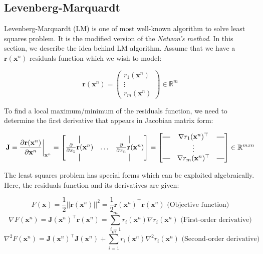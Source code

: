 \documentclass[a4paper]{report}
\numberwithin{figure}{section}
\newcommand{\R}{\mathbb{R}}
\newcommand*{\vertbar}{\rule[-1ex]{0.5pt}{2.5ex}}
\newcommand*{\horzbar}{\rule[.5ex]{2.5ex}{0.5pt}}
\begin{document}
\begin{appendices}
\subsection{Levenberg-Marquardt}
Levenberg-Marquardt (LM) is one of most well-known algorithm 
to solve least squares problem. It is the modified version of the \textit{Netwon's method}. 
In this section, we describe the idea behind 
LM algorithm. Assume that we have a $\mathbf{r}(\mathbf{x}^n)$ residuals 
function which we 
wish to model:

\begin{equation}
  \mathbf{r}(\mathbf{x}^n) = \begin{pmatrix} r_1(\mathbf{x}^n) \\ \vdots \\ r_m(\mathbf{x}^n) \end{pmatrix} \in \R^m
\end{equation}

To find a local maximum/minimum of the residuals function, we need to 
determine the first derivative that 
appears in Jacobian matrix form:

\begin{equation}
  \mathbf{J} = \frac{\partial \mathbf{r}(\mathbf{x}^n)}{\partial \mathbf{x}^n } \bigg|_{\mathbf{x}^n}
  = 
  \begin{bmatrix} 
    \vertbar & & \vertbar \\
    \frac{\partial}{\partial x_1}\mathbf{r}(\mathbf{x}^n) & \dots & \frac{\partial}{\partial x_n}\mathbf{r}(\mathbf{x}^n) \\
    \vertbar & & \vertbar
  \end{bmatrix}
  = 
  \begin{bmatrix}
    \horzbar & \nabla r_1(\mathbf{x}^n)^\top & \horzbar \\
     & \vdots & \\
     \horzbar & \nabla r_m(\mathbf{x}^n)^\top & \horzbar 
  \end{bmatrix}
  \in \R^{mxn}
\end{equation}

The least squares problem has special forms which can be exploited 
algebraically.
Here, the residuals function and its derivatives are given:

\begin{equation}
  F(\mathbf{x}) = \frac{1}{2} ||\mathbf{r}(\mathbf{x}^n)||^2 = \frac{1}{2} 
  \mathbf{r}(\mathbf{x}^n)^\top \mathbf{r}(\mathbf{x}^n) \text{  
  (Objective 
  function)}
\end{equation}\label{eq:residuals_objective}
\begin{equation}
\nabla F(\mathbf{x}^n) = \mathbf{J}(\mathbf{x}^n)^\top 
\mathbf{r}(\mathbf{x}^n) = 
\sum_{i=1}^{m} r_i(\mathbf{x}^n) \nabla r_i(\mathbf{x}^n) \text{  (First-order 
derivative)}
\end{equation}\label{eq:residuals_objective_first_der}
\begin{equation}
  \nabla^2 F(\mathbf{x}^n) = 
  \mathbf{J}(\mathbf{x}^n)^\top\mathbf{J}(\mathbf{x}^n) + \sum_{i=1}^m 
  r_i(\mathbf{x}^n) \nabla^2 r_i(\mathbf{x}^n) \text{ (Second-order 
  derivative)}
\end{equation}\label{eq:residuals_objective_second_der}



\end{appendices}
\end{document}
